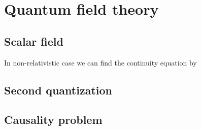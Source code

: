 \chapter{Quantum field theory}

\section{Scalar field}

In non-relativistic case we can find the continuity equation by

\section{Second quantization}

\section{Causality problem}
